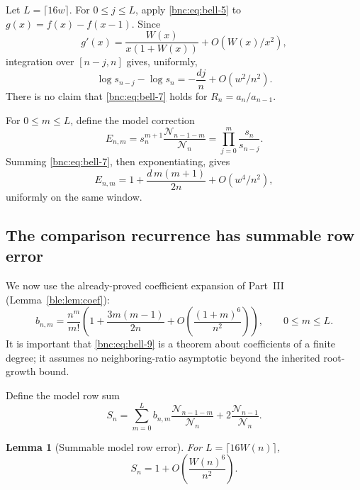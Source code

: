 \documentclass[11pt]{article}
\numberwithin{equation}{section}
\newtheorem{lemma}[theorem]{Lemma}
\theoremstyle{definition}
\theoremstyle{remark}
\begin{document}
Let \(L=\lceil16w\rceil\).
For \(0\le j\le L\), apply \eqref{bnc:eq:bell-5} to
\(g(x)=f(x)-f(x-1)\).
Since
\[
 g'(x)=\frac{W(x)}{x(1+W(x))}
            +O(W(x)/x^2),
\]
integration over \([n-j,n]\) gives, uniformly,
\begin{equation}\label{bnc:eq:bell-7}
\log s_{n-j}-\log s_n
 =-\frac{dj}{n}+O(w^2/n^2).
\end{equation}
There is no claim that \eqref{bnc:eq:bell-7} holds for \(R_n=a_n/a_{n-1}\).

For \(0\le m\le L\), define the model correction
\[
 E_{n,m}
 =s_n^{m+1}\frac{\mathcal N_{n-1-m}}{\mathcal N_n}
 =\prod_{j=0}^{m}\frac{s_n}{s_{n-j}}.
\]
Summing \eqref{bnc:eq:bell-7}, then exponentiating, gives
\begin{equation}\label{bnc:eq:bell-8}
E_{n,m}
 =1+\frac{d\,m(m+1)}{2n}+O(w^4/n^2),
\end{equation}
uniformly on the same window.

\subsection{The comparison recurrence has summable row error}

We now use the already-proved coefficient expansion of
Part~III (Lemma~\ref{ble:lem:coef}):
\begin{equation}\label{bnc:eq:bell-9}
b_{n,m}
 =\frac{n^m}{m!}
   \left(1+\frac{3m(m-1)}{2n}
          +O\!\left(\frac{(1+m)^6}{n^2}\right)\right),
 \qquad0\le m\le L.
\end{equation}
It is important that \eqref{bnc:eq:bell-9} is a theorem about coefficients of a finite
degree; it assumes no neighboring-ratio asymptotic beyond the
inherited root-growth bound.

Define the model row sum
\[
 S_n=
 \sum_{m=0}^{L}b_{n,m}
          \frac{\mathcal N_{n-1-m}}{\mathcal N_n}
       +2\frac{\mathcal N_{n-1}}{\mathcal N_n}.
\]

\begin{lemma}[Summable model row error]\label{bnc:lem:rowsum}
For \(L=\lceil16W(n)\rceil\),
\begin{equation}\label{bnc:eq:bell-10}
S_n=1+O\!\left(\frac{W(n)^6}{n^2}\right).
\end{equation}
\end{lemma}
\end{document}
